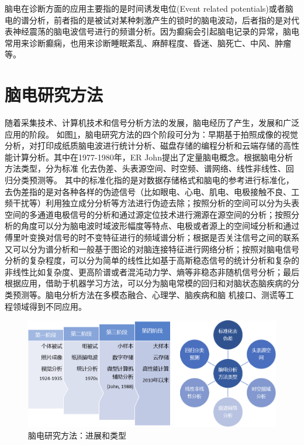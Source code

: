 脑电在诊断方面的应用主要指的是时间诱发电位(Event related potentials)或者脑电的谱分析，前者指的是被试对某种刺激产生的锁时的脑电波动，后者指的是对代表神经震荡的脑电波信号进行的频谱分析。因为癫痫会引起脑电记录的异常，脑电常用来诊断癫痫，也用来诊断睡眠紊乱、麻醉程度、昏迷、脑死亡、中风、肿瘤等。

\section{脑电研究方法}
随着采集技术、计算机技术和信号分析方法的发展，脑电经历了产生，发展和广泛应用的阶段。 如图\ref{fig4}，脑电研究方法的四个阶段可分为：早期基于拍照成像的视觉分析，对打印成纸质脑电波进行统计分析、磁盘存储的编程分析和云端存储的高性能计算分析。其中在1977-1980年，ER John提出了定量脑电概念。根据脑电分析方法类型，分为标准
化去伪差、头表源空间、时空频、谱网络、线性非线性、回归分类预测等。 其中的标准化指的是对数据存储格式和脑电的参考进行标准化，去伪差指的是对各种各样的伪迹信号（比如眼电、心电、肌电、电极接触不良、工频干扰等）利用独立成分分析等方法进行伪迹去除；按照分析的空间可以分为头表空间的多通道电极信号的分析和通过源定位技术进行溯源在源空间的分析；按照分析的角度可以分为脑电波时域波形幅度等特点、电极或者源上的空间域分析和通过傅里叶变换对信号的时不变特征进行的频域谱分析；根据是否关注信号之间的联系又可以分为谱分析和一般基于图论的对脑连接特征进行网络分析；按照对脑电信号分析的复杂程度，可以分为简单的线性比如基于高斯稳态信号的统计分析和复杂的非线性比如复杂度、更高阶谱或者混沌动力学、熵等非稳态非随机信号分析；最后根据应用，借助于机器学习方法，可以分为脑电常模的回归和对脑状态脑疾病的分类预测等。脑电分析方法在多模态融合、心理学、脑疾病和脑
机接口、测谎等工程领域得到不同应用。
\begin{figure}
	\includegraphics[width=15cm]{pic/xulun/evolution.png}
	\caption{脑电研究方法：进展和类型}
	\label{fig4}
\end{figure}

